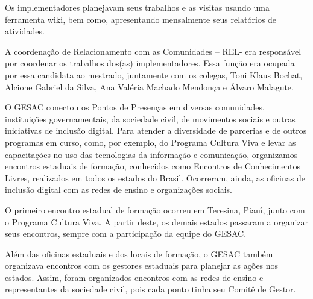 \documentclass[
12pt,		%
openright,	%
twoside,  %
a4paper,			%
chapter=TITLE,		%
english,			%
french,				%
spanish,			%
brazil				%
]{USPSC-classe/USPSC}
\begin{document}
Os implementadores planejavam seus trabalhos e as visitas usando uma ferramenta wiki, bem como, apresentando mensalmente seus relat\'orios de atividades.









A coordena\c{c}\~ao de Relacionamento com as Comunidades – REL- era respons\'avel por coordenar os trabalhos dos(as) implementadores. Essa fun\c{c}\~ao era ocupada por essa candidata ao mestrado,  juntamente com os colegas, Toni Klaus Bochat, Alcione  Gabriel da Silva, Ana Val\'eria Machado Mendon\c{c}a e \'Alvaro Malagute.









O GESAC conectou os Pontos de Presen\c{c}as em diversas comunidades, institui\c{c}\~oes governamentais, da sociedade civil, de movimentos sociais e outras iniciativas de inclus\~ao digital. Para  atender a diversidade de parcerias  e de outros programas em curso, como, por exemplo, do Programa Cultura Viva e levar as  capacita\c{c}\~oes no uso das tecnologias da informa\c{c}\~ao e comunica\c{c}\~ao, organizamos encontros estaduais de forma\c{c}\~ao, conhecidos como Encontros de Conhecimentos Livres, realizados em todos os estados do Brasil. Ocorreram, ainda, as  oficinas de inclus\~ao digital com as redes de ensino e organiza\c{c}\~oes sociais.









O primeiro encontro estadual de forma\c{c}\~ao ocorreu em  Teresina, Piau\'{\i}, junto com o Programa Cultura Viva. A partir deste, os demais estados passaram a organizar seus encontros, sempre com a participa\c{c}\~ao da equipe do GESAC.









Al\'em das oficinas estaduais e dos locais de forma\c{c}\~ao, o GESAC tamb\'em organizava encontros com os gestores estaduais para planejar as a\c{c}\~oes nos estados. Assim, foram organizados encontros com as redes de ensino e  representantes da sociedade civil, pois cada ponto  tinha seu Comit\^e de Gestor.
\end{document}

